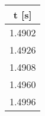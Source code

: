 \documentclass[a4paper,11pt,oneside]{article}
\begin{document}
\begin{figure}[h!]
{        \begin{tabular}{c}
            \toprule
            \textbf{t [s]}\\
            \midrule
            1.4902\\
1.4926\\
1.4908\\
1.4960\\
1.4996\\
            \bottomrule
        \end{tabular}
    }
\end{figure}
\end{document}
